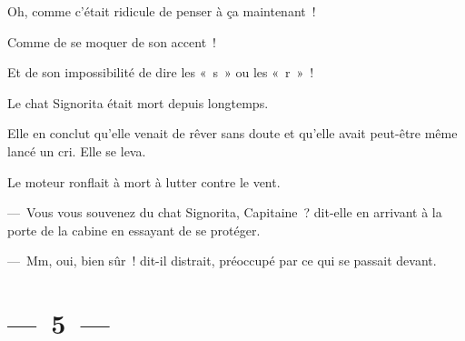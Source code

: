 \documentclass[french,twoside]{book} %
\begin{document}
Oh, comme c’était ridicule de penser à ça maintenant !\par
Comme de se moquer de son accent !\par
Et de son impossibilité de dire les « s » ou les « r » !\par
Le chat Signorita était mort depuis longtemps.\par
Elle en conclut qu’elle venait de rêver sans doute et qu’elle avait peut-être même lancé un cri. Elle se leva.\par
Le moteur ronflait à mort à lutter contre le vent.\par
— Vous vous souvenez du chat Signorita, Capitaine ? dit-elle en arrivant à la porte de la cabine en essayant de se protéger.\par
— Mm, oui, bien sûr ! dit-il distrait, préoccupé par ce qui se passait devant.

\section[{— 5 —}]{— 5 —}
\renewcommand{\leftmark}{— 5 —}
\end{document}
